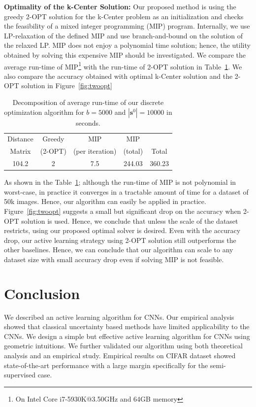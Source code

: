 \documentclass{article}
\begin{document}
\noindent\textbf{Optimality of the k-Center Solution:} Our proposed method is using the greedy 2-OPT solution for the k-Center problem as an initialization and checks the feasibility of a mixed integer programming (MIP) program. Internally, we use LP-relaxation of the defined MIP and use branch-and-bound on the solution of the relaxed LP. MIP does not enjoy a polynomial time solution; hence, the utility obtained by solving this expensive MIP should be investigated. We compare the average run-time of MIP\footnote{On Intel Core i7-5930K@3.50GHz and 64GB memory} with the run-time of 2-OPT solution in Table~\ref{tab:runtime}. We also compare the accuracy obtained with optimal k-Center solution and the 2-OPT solution in Figure~\ref{fig:twoopt}


\begin{table}[ht]
\centering
\vspace{-3mm}
\caption{Decomposition of average run-time of our discrete optimization algorithm for $b=5000$ and $|\mathbf{s}^0|=10000$ in seconds.}
\begin{tabular}{ccccc} \toprule
 Distance& Greedy & MIP & MIP &  \\
Matrix &(2-OPT) & (per iteration) & (total) & Total \\ \midrule
104.2  & 2   & 7.5  &  244.03  & 360.23  \\ \bottomrule
\end{tabular}
\label{tab:runtime}
\vspace{-2mm}
\end{table}

As shown in the Table~\ref{tab:runtime}; although the run-time of MIP is not polynomial in worst-case, in practice it converges in a tractable amount of time for a dataset of 50k images. Hence, our algorithm can easily be applied in practice. Figure~\ref{fig:twoopt} suggests a small but significant drop on the accuracy when 2-OPT solution is used. Hence, we conclude that unless the scale of the dataset restricts, using our proposed optimal solver is desired. Even with the accuracy drop, our active learning strategy using 2-OPT solution still outperforms the other baselines. Hence, we can conclude that our algorithm can scale to any dataset size with small accuracy drop even if solving MIP is not feasible.

\section{Conclusion}
We described an active learning algorithm for CNNs. Our empirical analysis showed that classical uncertainty based methods have limited applicability to the CNNs. We design a simple but effective active learning algorithm for CNNs using geometric intuitions. We further validated our algorithm using both theoretical analysis and an empirical study. Empirical results on CIFAR\cite{cifar} dataset showed state-of-the-art performance with a large margin specifically for the semi-supervised case.
\end{document}
